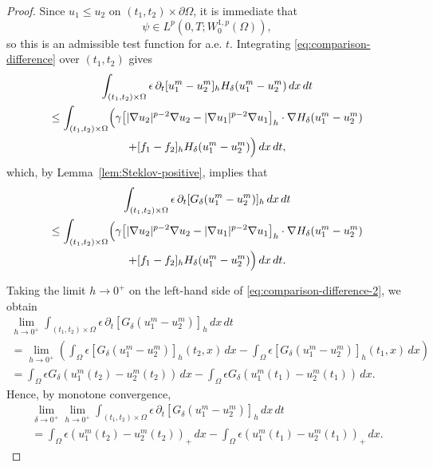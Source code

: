 \documentclass[a4paper,12pt]{article}
\theoremstyle{definition}
\theoremstyle{remark}
\begin{document}
\begin{proof}
Since $u_1\le u_2$ on $(t_1,t_2)\times\partial\Omega$, it is immediate that
\[
\psi\in L^p(0,T;W^{1,p}_0(\Omega)),
\]
so this is an admissible test function for a.e. $t$. Integrating \eqref{eq:comparison-difference} over $(t_1,t_2)$ gives
\begin{multline}
\int_{(t_1,t_2)\times\Omega}\epsilon\,\partial_t[u_1^m-u_2^m]_hH_\delta(u_1^m-u_2^m)\,dx\,dt\\
\le \int_{(t_1,t_2)\times\Omega}\Bigl(\gamma\bigl[|\nabla u_2|^{p-2}\nabla u_2-|\nabla u_1|^{p-2}\nabla u_1\bigr]_h\cdot\nabla H_\delta(u_1^m-u_2^m)\\
+[f_1-f_2]_hH_\delta(u_1^m-u_2^m)\Bigr)\,dx\,dt,
\end{multline}
which, by Lemma~\ref{lem:Steklov-positive}, implies that
\begin{multline}\label{eq:comparison-difference-2}
\int_{(t_1,t_2)\times\Omega}\epsilon\,\partial_t[G_\delta(u_1^m-u_2^m)]_h\,dx\,dt\\
\le \int_{(t_1,t_2)\times\Omega}\Bigl(\gamma\bigl[|\nabla u_2|^{p-2}\nabla u_2-|\nabla u_1|^{p-2}\nabla u_1\bigr]_h\cdot\nabla H_\delta(u_1^m-u_2^m)\\
+[f_1-f_2]_hH_\delta(u_1^m-u_2^m)\Bigr)\,dx\,dt.
\end{multline}

Taking the limit $h\to0^+$ on the left-hand side of \eqref{eq:comparison-difference-2}, we obtain
\begin{multline}
\lim_{h\to0^+}\int_{(t_1,t_2)\times\Omega}\epsilon\,\partial_t[G_\delta(u_1^m-u_2^m)]_h\,dx\,dt\\
=\lim_{h\to0^+}\left(\int_\Omega \epsilon [G_\delta(u_1^m-u_2^m)]_h(t_2,x)\,dx-\int_\Omega \epsilon [G_\delta(u_1^m-u_2^m)]_h(t_1,x)\,dx\right)\\
=\int_\Omega \epsilon G_\delta(u_1^m(t_2)-u_2^m(t_2))\,dx-\int_\Omega \epsilon G_\delta(u_1^m(t_1)-u_2^m(t_1))\,dx.
\end{multline}
Hence, by monotone convergence,
\begin{multline}\label{eq:comparison-left-limit}
\lim_{\delta\to0^+}\lim_{h\to0^+}\int_{(t_1,t_2)\times\Omega}\epsilon\,\partial_t[G_\delta(u_1^m-u_2^m)]_h\,dx\,dt\\
=\int_\Omega \epsilon (u_1^m(t_2)-u_2^m(t_2))_+\,dx-\int_\Omega \epsilon (u_1^m(t_1)-u_2^m(t_1))_+\,dx.
\end{multline}


\end{proof}
\end{document}
